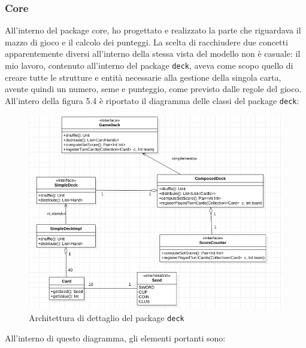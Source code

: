 \subsubsection{\textbf{Core}}
All'interno del package core, ho progettato e realizzato la parte che riguardava il mazzo di gioco e il calcolo dei punteggi.
La scelta di racchiudere due concetti apparentemente diversi all'interno della stessa vista del modello non è casuale: il mio lavoro, contenuto all'interno del package \texttt{deck}, aveva come scopo quello di creare tutte le strutture e entità necessarie alla gestione della singola carta, avente quindi un numero, seme e punteggio, come previsto dalle regole del gioco.
All'intero della figura 5.4 è riportato il diagramma delle classi del package \texttt{deck}:
 \begin{figure}[H]
	\includegraphics[width=\textwidth,height=\textheight,keepaspectratio]{deckArchitecture}
	\caption{Architettura di dettaglio del package \texttt{deck}}
\end{figure}
All'interno di questo diagramma, gli elementi portanti sono:
